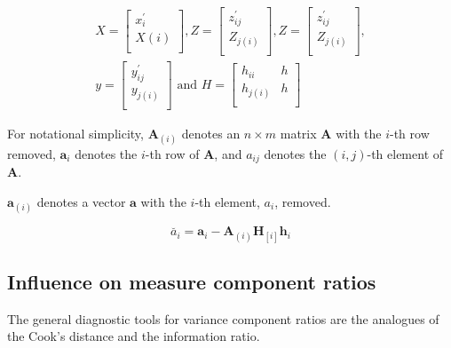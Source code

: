 \documentclass[12pt, a4paper]{report}
\theoremstyle{plain}
\theoremstyle{definition}
\theoremstyle{remark}
\begin{document}
	\begin{eqnarray*}
		X= \left[%
		\begin{array}{c}
			x^\prime_{i} \\
			X(i) \\
		\end{array}%
		\right],
		Z= \left[%
		\begin{array}{c}
			z^\prime_{ij} \\
			Z_{j(i)} \\
		\end{array}%
		\right] ,
		Z = \left[%
		\begin{array}{c}
			z^\prime_{ij} \\
			Z_{j(i)} \\
		\end{array}%
		\right], \\
		y = \left[%
		\begin{array}{c}
			y^\prime_{ij} \\
			y_{j(i)} \\
		\end{array}%
		\right]
		\mbox{ and } H = \left[%
		\begin{array}{cc}
			h_{ii}& h\\
			h_{j(i)} & h\\
		\end{array}%
		\right]
	\end{eqnarray*}
	
	For notational simplicity, $\boldsymbol{A}_{(i)}$ denotes an $n
	\times m$ matrix  $\boldsymbol{A}$ with the $i$-th row removed,
	$\boldsymbol{a}_{i}$ denotes the $i$-th row of $\boldsymbol{A}$,
	and $a_{ij}$ denotes the $(i, j)$-th element of $\boldsymbol{A}$.
	
	$\boldsymbol{a}_{(i)}$ denotes a vector $\boldsymbol{a}$ with the $i$-th element, $a_{i}$, removed.
	
	\begin{equation}
	\breve{a_{i}} =  \boldsymbol{a}_{i} -
	\boldsymbol{A}_{(i)}\boldsymbol{H}_{[i]}\boldsymbol{h}_{i}
	\end{equation}
	
	\subsection{Influence on measure component ratios}               %
	The general diagnostic tools for variance component ratios are the analogues of the Cook's distance and the information ratio.
	
\end{document}
